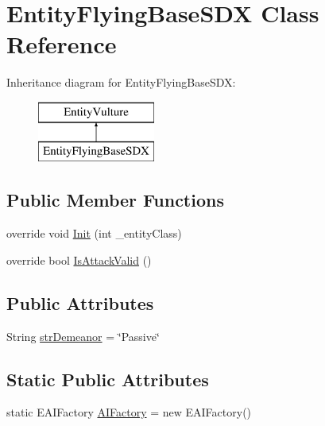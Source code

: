 \hypertarget{class_entity_flying_base_s_d_x}{}\section{Entity\+Flying\+Base\+S\+DX Class Reference}
\label{class_entity_flying_base_s_d_x}
Inheritance diagram for Entity\+Flying\+Base\+S\+DX\+:\begin{figure}[H]
\begin{center}
\leavevmode
\includegraphics[height=2.000000cm]{class_entity_flying_base_s_d_x}
\end{center}
\end{figure}
\subsection*{Public Member Functions}
\begin{DoxyCompactItemize}
\item 
override void \mbox{\hyperlink{class_entity_flying_base_s_d_x_a4d523276acced698e348d07b6761535e}{Init}} (int \+\_\+entity\+Class)
\item 
override bool \mbox{\hyperlink{class_entity_flying_base_s_d_x_a2208d036acaab6140efce0eb7774401a}{Is\+Attack\+Valid}} ()
\end{DoxyCompactItemize}
\subsection*{Public Attributes}
\begin{DoxyCompactItemize}
\item 
String \mbox{\hyperlink{class_entity_flying_base_s_d_x_a2f082afb7876cd6cb28888971cbc9e2d}{str\+Demeanor}} = \char`\"{}Passive\char`\"{}
\end{DoxyCompactItemize}
\subsection*{Static Public Attributes}
\begin{DoxyCompactItemize}
\item 
static E\+A\+I\+Factory \mbox{\hyperlink{class_entity_flying_base_s_d_x_a6090bff9248f106e95097b0ab526b60b}{A\+I\+Factory}} = new E\+A\+I\+Factory()
\end{DoxyCompactItemize}


